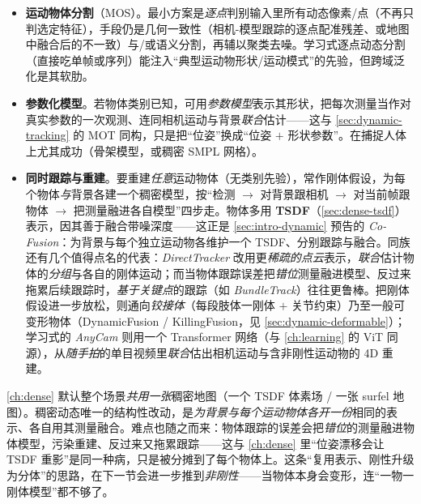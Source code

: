 \begin{itemize}
  \item \textbf{运动物体分割}（MOS）。最小方案是\emph{逐点}判别输入里所有动态像素/点（不再只判选定特征），手段仍是几何一致性（相机-模型跟踪的逐点配准残差、或地图中融合后的不一致）与/或语义分割，再辅以聚类去噪。学习式逐点动态分割（直接吃单帧或序列）能注入“典型运动物形状/运动模式”的先验，但跨域泛化是其软肋。
  \item \textbf{参数化模型}。若物体类别已知，可用\emph{参数模型}表示其形状，把每次测量当作对真实参数的一次观测、连同相机运动与背景\emph{联合}估计——这与 \cref{sec:dynamic-tracking} 的 MOT 同构，只是把“位姿”换成“位姿 $+$ 形状参数”。在捕捉人体上尤其成功（骨架模型，或稠密 SMPL 网格）。
  \item \textbf{同时跟踪与重建}。要重建\emph{任意}运动物体（无类别先验），常作刚体假设，为每个物体\emph{与}背景各建一个稠密模型，按“检测 $\to$ 对背景跟相机 $\to$ 对当前帧跟物体 $\to$ 把测量融进各自模型”四步走。物体多用 \textbf{TSDF}（\cref{sec:dense-tsdf}）表示，因其善于融合带噪深度——这正是 \cref{sec:intro-dynamic} 预告的 \emph{Co-Fusion}\cite{runz2017cofusion}：为背景与每个独立运动物各维护一个 TSDF、分别跟踪与融合。同族还有几个值得点名的代表\cite{schmid2026dynamic}：\emph{DirectTracker} 改用更\emph{稀疏的点云}表示，\emph{联合}估计物体的\emph{分组}与各自的刚体运动；而当物体跟踪误差把\emph{错位}测量融进模型、反过来拖累后续跟踪时，\emph{基于关键点}的跟踪（如 \emph{BundleTrack}）往往更鲁棒。把刚体假设进一步放松，则通向\emph{铰接体}（每段肢体一刚体 $+$ 关节约束）乃至一般可变形物体（DynamicFusion / KillingFusion，见 \cref{sec:dynamic-deformable}）；学习式的 \emph{AnyCam} 则用一个 Transformer 网络（与 \cref{ch:learning} 的 ViT 同源），从\emph{随手拍}的单目视频里\emph{联合}估出相机运动与含非刚性运动物的 4D 重建。
\end{itemize}

\begin{insight}[稠密动态 $=$ 把 \cref{ch:dense} 的“一个模型”复制成“一物一模型”]
\cref{ch:dense} 默认整个场景\emph{共用一张}稠密地图（一个 TSDF 体素场 / 一张 surfel 地图）。稠密动态唯一的结构性改动，是\emph{为背景与每个运动物体各开一份}相同的表示、各自用其测量融合。难点也随之而来：物体跟踪的误差会把\emph{错位}的测量融进物体模型，污染重建、反过来又拖累跟踪——这与 \cref{ch:dense} 里“位姿漂移会让 TSDF 重影”是同一种病，只是被分摊到了每个物体上。这条“复用表示、刚性升级为分体”的思路，在下一节会进一步推到\emph{非刚性}——当物体本身会变形，连“一物一刚体模型”都不够了。
\end{insight}

